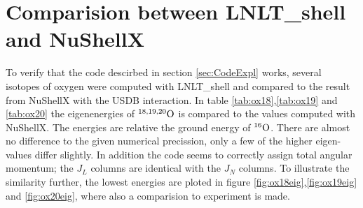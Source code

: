 \section{Comparision between LNLT\_shell and NuShellX}

To verify that the code descirbed in section \ref{sec:CodeExpl} works, several isotopes of oxygen were computed with LNLT\_shell and compared to the result from NuShellX with the USDB interaction. In table \ref{tab:ox18},\ref{tab:ox19} and \ref{tab:ox20} the eigenenergies of \(^{18,19,20}\rm{O}\) is compared to the values computed with NuShellX. The energies are relative the ground energy of \(^{16}\rm{O}\). There are almost no difference to the given numerical precission, only a few of the higher eigen-values differ slightly. In addition the code seems to correctly assign total angular momentum; the \(J_L\) columns are identical with the \(J_N\) columns. To illustrate the similarity further, the lowest energies are ploted in figure \ref{fig:ox18eig},\ref{fig:ox19eig} and \ref{fig:ox20eig}, where also a comparision to experiment is made.

\onecolumngrid


